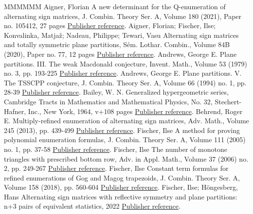 \begin{thebibliography}{MMMMMM}
 Aigner, Florian A new determinant for the Q-enumeration of alternating sign matrices, J. Combin. Theory Ser. A, Volume 180 (2021), Paper no. 105412, 27 pages \href{https://alco.centre-mersenne.org/articles/10.5802/alco.374/#Aigner21}{Publisher reference}.
 Aigner, Florian; Fischer, Ilse; Konvalinka, Matjaž; Nadeau, Philippe; Tewari, Vasu Alternating sign matrices and totally symmetric plane partitions, Sém. Lothar. Combin., Volume 84B (2020), Paper no. 77, 12 pages \href{https://alco.centre-mersenne.org/articles/10.5802/alco.374/#AignerFischerKonvalinkaNadeauTewari20}{Publisher reference}.
 Andrews, George E. Plane partitions. III. The weak Macdonald conjecture, Invent. Math., Volume 53 (1979) no. 3, pp. 193-225 \href{https://alco.centre-mersenne.org/articles/10.5802/alco.374/#Andrews79}{Publisher reference}.
 Andrews, George E. Plane partitions. V. The TSSCPP conjecture, J. Combin. Theory Ser. A, Volume 66 (1994) no. 1, pp. 28-39 \href{https://alco.centre-mersenne.org/articles/10.5802/alco.374/#Andrews94}{Publisher reference}.
 Bailey, W. N. Generalized hypergeometric series, Cambridge Tracts in Mathematics and Mathematical Physics, No. 32, Stechert-Hafner, Inc., New York, 1964, v+108 pages \href{https://alco.centre-mersenne.org/articles/10.5802/alco.374/#Bailey35}{Publisher reference}.
 Behrend, Roger E. Multiply-refined enumeration of alternating sign matrices, Adv. Math., Volume 245 (2013), pp. 439-499 \href{https://alco.centre-mersenne.org/articles/10.5802/alco.374/#Behrend13}{Publisher reference}.
 Fischer, Ilse A method for proving polynomial enumeration formulas, J. Combin. Theory Ser. A, Volume 111 (2005) no. 1, pp. 37-58 \href{https://alco.centre-mersenne.org/articles/10.5802/alco.374/#Fischer05}{Publisher reference}.
 Fischer, Ilse The number of monotone triangles with prescribed bottom row, Adv. in Appl. Math., Volume 37 (2006) no. 2, pp. 249-267 \href{https://alco.centre-mersenne.org/articles/10.5802/alco.374/#Fischer06}{Publisher reference}.
 Fischer, Ilse Constant term formulas for refined enumerations of Gog and Magog trapezoids, J. Combin. Theory Ser. A, Volume 158 (2018), pp. 560-604 \href{https://alco.centre-mersenne.org/articles/10.5802/alco.374/#Fischer18}{Publisher reference}.
 Fischer, Ilse; Höngesberg, Hans Alternating sign matrices with reflective symmetry and plane partitions: n+3 pairs of equivalent statistics, 2022 \href{https://alco.centre-mersenne.org/articles/10.5802/alco.374/#FH2022}{Publisher reference}.

\end{thebibliography}

